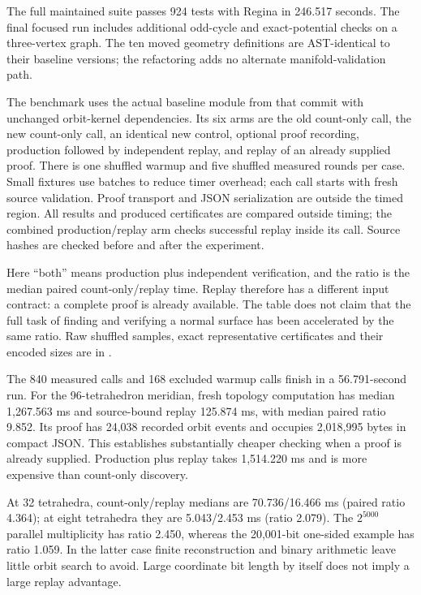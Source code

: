 The full maintained suite passes 924 tests with Regina in 246.517 seconds.
The final focused run includes additional odd-cycle and exact-potential
checks on a three-vertex graph. The ten moved geometry definitions are
AST-identical to their baseline versions; the refactoring adds no alternate
manifold-validation path.

The benchmark uses the actual baseline module from that commit with unchanged
orbit-kernel dependencies. Its six arms are the old count-only call, the new
count-only call, an identical new control, optional proof recording,
production followed by independent replay, and replay of an already supplied
proof. There is one shuffled warmup and five shuffled measured rounds per
case. Small fixtures use batches to reduce timer overhead; each call starts
with fresh source validation. Proof transport and JSON serialization are
outside the timed region. All results and produced certificates are compared
outside timing; the combined production/replay arm checks successful replay
inside its call. Source hashes are checked before and after the experiment.



Here ``both'' means production plus independent verification, and the ratio
is the median paired count-only/replay time. Replay therefore has a different
input contract: a complete proof is already available. The table does not
claim that the full task of finding and verifying a normal surface has been
accelerated by the same ratio. Raw shuffled samples, exact representative
certificates and their encoded sizes are in
.

The 840 measured calls and 168 excluded warmup calls finish in a
56.791-second run. For the 96-tetrahedron meridian, fresh topology computation
has median 1,267.563 ms and source-bound replay 125.874 ms, with median
paired ratio 9.852. Its proof has 24,038 recorded orbit events and occupies
2,018,995 bytes in compact JSON. This establishes substantially cheaper
checking when a proof is already supplied. Production plus replay takes
1,514.220 ms and is more expensive than count-only discovery.

At 32 tetrahedra, count-only/replay medians are 70.736/16.466 ms (paired
ratio 4.364); at eight tetrahedra they are 5.043/2.453 ms (ratio 2.079).
The $2^{5000}$ parallel multiplicity has ratio 2.450, whereas the 20,001-bit
one-sided example has ratio 1.059. In the latter case finite reconstruction
and binary arithmetic leave little orbit search to avoid. Large coordinate
bit length by itself does not imply a large replay advantage.

